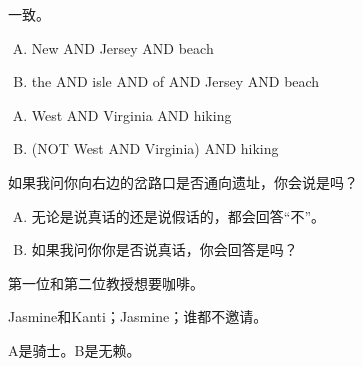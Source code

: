 {{\begin{practices}
            一致。
        \end{practices}

        \begin{practices}
            \begin{enumerate}[A.]
                \item New AND Jersey AND beach
                \item the AND isle AND of AND Jersey AND beach
            \end{enumerate}
        \end{practices}

        \begin{practices}
            \begin{enumerate}[A.]
                \item West AND Virginia AND hiking
                \item (NOT West AND Virginia) AND hiking
            \end{enumerate}
        \end{practices}

        \begin{practices}
            如果我问你向右边的岔路口是否通向遗址，你会说是吗？
        \end{practices}

        \begin{practices}
            \begin{enumerate}[A.]
                \item 无论是说真话的还是说假话的，都会回答``不''。
                \item 如果我问你你是否说真话，你会回答是吗？
            \end{enumerate}
        \end{practices}

        \begin{practices}
            第一位和第二位教授想要咖啡。
        \end{practices}

        \begin{practices}
            Jasmine和Kanti；Jasmine；谁都不邀请。
        \end{practices}

        \begin{practices}
            A是骑士。B是无赖。


\end{practices}}}
